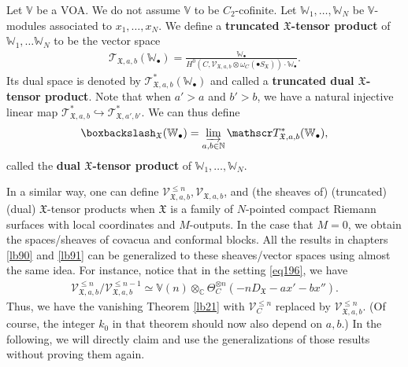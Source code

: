 \documentclass[12pt,a4paper,notitlepage]{report}
\theoremstyle{definition}
\theoremstyle{plain}
\newcommand{\fk}{\mathfrak}
\newcommand{\scr}{\mathscr}
\newcommand{\SX}{S_{\fk X}}
\newcommand{\DX}{D_{\fk X}}
\newcommand{\blt}{\bullet}
\newcommand{\Vbb}{\mathbb V}
\newcommand{\Wbb}{\mathbb W}
\newcommand{\Cbb}{\mathbb C}
\newcommand{\Nbb}{\mathbb N}
\newcommand{\low}{\mathrm{low}}
\numberwithin{equation}{section}
\begin{document}
Let $\Vbb$ be a  VOA. We do not assume $\Vbb$ to be $C_2$-cofinite. Let $\Wbb_1,\dots,\Wbb_N$ be $\Vbb$-modules associated to $x_1,\dots,x_N$. We define a \textbf{truncated  $\fk X$-tensor product} of $\Wbb_1,\dots\Wbb_N$  to be the vector space \index{T@$\scr T_{\fk X,a,b}(\Wbb_\blt),\scr T_{\fk X,a,b}^*(\Wbb_\blt)$}
\begin{align}
\scr T_{\fk X,a,b}(\Wbb_\blt)=\frac{\Wbb_\blt}{H^0(C,\scr V_{\fk X,a,b}\otimes\omega_C(\blt\SX))\cdot\Wbb_\blt}.
\end{align}
Its dual space is denoted by $\scr T_{\fk X,a,b}^*(\Wbb_\blt)$ and called a \textbf{truncated dual $\fk X$-tensor product}. Note that when $a'>a$ and $b'>b$, we have a natural injective linear map $\scr T_{\fk X,a,b}^*\hookrightarrow \scr T_{\fk X,a',b'}^*$. We can thus define \index{W@$\boxbackslash_{\fk X}(\Wbb_\blt),\boxbackslash_{\fk X}^\low(\Wbb_\blt)$}
\begin{gather*}
\boxbackslash_{\fk X}(\Wbb_\blt)=\varinjlim_{a,b\in\Nbb}\scr T_{\fk X,a,b}^*(\Wbb_\blt),
\end{gather*}
called the \textbf{dual $\fk X$-tensor product} of $\Wbb_1,\dots,\Wbb_N$.


In a similar way, one can define $\scr V_{\fk X,a,b}^{\leq n},\scr V_{\fk X,a,b}$, and (the sheaves of) (truncated) (dual) $\fk X$-tensor products  when $\fk X$ is a family of $N$-pointed compact Riemann surfaces with local coordinates and $M$-outputs. In the case that $M=0$, we obtain the spaces/sheaves of covacua and conformal blocks. All the results in chapters \ref{lb90} and \ref{lb91} can be generalized to these sheaves/vector spaces using almost the same idea. For instance, notice that in the setting \eqref{eq196}, we have
\begin{align}
\scr V_{\fk X,a,b}^{\leq n}/\scr V_{\fk X,a,b}^{\leq n-1}\simeq\Vbb(n)\otimes_\Cbb\Theta_C^{\otimes n}(-n\DX-ax'-bx'').
\end{align}
Thus, we have the vanishing Theorem \ref{lb21} with $\scr V_C^{\leq n}$ replaced by $\scr V_{\fk X,a,b}^{\leq n}$. (Of course, the integer $k_0$ in that theorem should now also depend on $a,b$.) In the following, we will directly claim and use the generalizations of those results without  proving them again.
\end{document}
